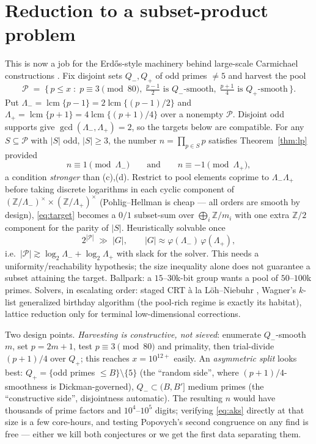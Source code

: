 \documentclass[10pt]{article}
\newcommand{\Z}{\mathbb{Z}}
\DeclareMathOperator{\lcm}{lcm}
\begin{document}
\section{Reduction to a subset-product problem}

This is now a job for the Erd\H{o}s-style machinery behind large-scale
Carmichael constructions \cite{AGP,LN}. Fix disjoint sets $Q_-, Q_+$ of odd
primes $\neq 5$ and harvest the pool
\[
\mathcal{P} \;=\; \bigl\{\, p \le x \;:\; p \equiv 3 \!\!\pmod{80},\;
\tfrac{p-1}{2} \text{ is } Q_-\text{-smooth},\;
\tfrac{p+1}{4} \text{ is } Q_+\text{-smooth} \,\bigr\}.
\]
Put $\Lambda_-=\lcm\{p-1\}=2\lcm\{(p-1)/2\}$ and
$\Lambda_+=\lcm\{p+1\}=4\lcm\{(p+1)/4\}$ over a nonempty $\mathcal{P}$.
Disjoint odd supports give $\gcd(\Lambda_-,\Lambda_+)=2$, so the targets
below are compatible. For any $S \subseteq \mathcal{P}$ with $|S|$ odd, $|S| \ge 3$,
the number $n = \prod_{p \in S} p$ satisfies Theorem~\ref{thm:lp} provided
\begin{equation}\label{eq:target}
n \equiv 1 \pmod{\Lambda_-} \qquad\text{and}\qquad n \equiv -1 \pmod{\Lambda_+},
\end{equation}
a condition \emph{stronger} than (c),(d). Restrict to pool elements coprime
to $\Lambda_-\Lambda_+$ before taking discrete logarithms in each cyclic component of
$(\Z/\Lambda_-)^\times \times (\Z/\Lambda_+)^\times$ (Pohlig--Hellman is cheap
--- all orders are smooth by design), \eqref{eq:target} becomes a $0/1$
subset-sum over $\bigoplus_i \Z/m_i$ with one extra $\Z/2$ component for the
parity of $|S|$. Heuristically solvable once
\[
2^{|\mathcal{P}|} \;\gg\; |G|, \qquad
|G| \approx \varphi(\Lambda_-)\,\varphi(\Lambda_+),
\]
i.e.\ $|\mathcal{P}| \gtrsim \log_2 \Lambda_- + \log_2 \Lambda_+$ with slack
for the solver. This needs a uniformity/reachability hypothesis; the size
inequality alone does not guarantee a subset attaining the target.
Ballpark: a $15$--$30$k-bit group wants a pool of
$50$--$100$k primes. Solvers, in escalating order: staged CRT \`a la
L\"oh--Niebuhr \cite{LN}, Wagner's $k$-list generalized birthday algorithm
\cite{Wagner} (the pool-rich regime is exactly its habitat), lattice reduction
only for terminal low-dimensional corrections.

Two design points. \emph{Harvesting is constructive, not sieved}: enumerate
$Q_-$-smooth $m$, set $p = 2m+1$, test $p \equiv 3 \pmod{80}$ and primality,
then trial-divide $(p+1)/4$ over $Q_+$; this reaches $x = 10^{12+}$ easily. An
\emph{asymmetric split} looks best: $Q_+ = \{$odd primes $\le B\} \setminus
\{5\}$ (the ``random side'', where $(p+1)/4$-smoothness is Dickman-governed),
$Q_- \subset (B, B']$ medium primes (the ``constructive side'', disjointness
automatic). The resulting $n$ would have thousands of prime factors and
$10^4$--$10^5$ digits; verifying \eqref{eq:aks} directly at that size is a few
core-hours, and testing Popovych's second congruence on any find is free ---
either we kill both conjectures or we get the first data separating them.
\end{document}
